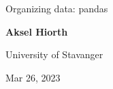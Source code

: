 \documentclass[%
oneside,                 %
final,                   %
10pt]{article}
\begin{document}

\newcommand{\exercisesection}[1]{\subsection*{#1}}







\thispagestyle{empty}

\begin{center}
{\LARGE\bf
\begin{spacing}{1.25}
Organizing data: pandas
\end{spacing}
}
\end{center}


\begin{center}
{\bf Aksel Hiorth${}^{}$} \\ [0mm]
\end{center}

\begin{center}
\end{center}
    
University of Stavanger

\begin{center}
Mar 26, 2023
\end{center}

\vspace{1cm}


\tableofcontents

\vspace{1cm} %

\end{document}
